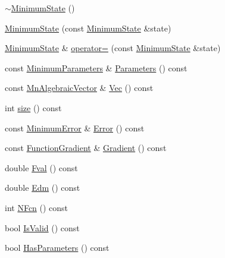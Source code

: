 \begin{DoxyCompactItemize}
\item 
\mbox{\hyperlink{classROOT_1_1Minuit2_1_1MinimumState_a30666c7113d7e8c199d4de1b1a44ee03}{$\sim$\+Minimum\+State}} ()
\item 
\mbox{\hyperlink{classROOT_1_1Minuit2_1_1MinimumState_a7e5a25f631c74fffd8cfd14d2268600e}{Minimum\+State}} (const \mbox{\hyperlink{classROOT_1_1Minuit2_1_1MinimumState}{Minimum\+State}} \&state)
\item 
\mbox{\hyperlink{classROOT_1_1Minuit2_1_1MinimumState}{Minimum\+State}} \& \mbox{\hyperlink{classROOT_1_1Minuit2_1_1MinimumState_ad0d12f94b8f1adca2b2c4279006f82e4}{operator=}} (const \mbox{\hyperlink{classROOT_1_1Minuit2_1_1MinimumState}{Minimum\+State}} \&state)
\item 
const \mbox{\hyperlink{classROOT_1_1Minuit2_1_1MinimumParameters}{Minimum\+Parameters}} \& \mbox{\hyperlink{classROOT_1_1Minuit2_1_1MinimumState_aa81bb59c8eb8c262ef2487ca1b025481}{Parameters}} () const
\item 
const \mbox{\hyperlink{namespaceROOT_1_1Minuit2_a62ed97730a1ca8d3fbaec64a19aa11c9}{Mn\+Algebraic\+Vector}} \& \mbox{\hyperlink{classROOT_1_1Minuit2_1_1MinimumState_a0c7ad9c9226473f87b1bbb15ed87bbcd}{Vec}} () const
\item 
int \mbox{\hyperlink{classROOT_1_1Minuit2_1_1MinimumState_af680928a4485a4d0db0c81a8283d24bd}{size}} () const
\item 
const \mbox{\hyperlink{classROOT_1_1Minuit2_1_1MinimumError}{Minimum\+Error}} \& \mbox{\hyperlink{classROOT_1_1Minuit2_1_1MinimumState_a28d9bb6148e54a7bf4ca15ca9548fe23}{Error}} () const
\item 
const \mbox{\hyperlink{classROOT_1_1Minuit2_1_1FunctionGradient}{Function\+Gradient}} \& \mbox{\hyperlink{classROOT_1_1Minuit2_1_1MinimumState_a08a0d667e1f89522a29c49c9c02e642d}{Gradient}} () const
\item 
double \mbox{\hyperlink{classROOT_1_1Minuit2_1_1MinimumState_aad936fc04cd24c5b769748b93ded0ab9}{Fval}} () const
\item 
double \mbox{\hyperlink{classROOT_1_1Minuit2_1_1MinimumState_a397315b170efca9446f7d6a91bae6c59}{Edm}} () const
\item 
int \mbox{\hyperlink{classROOT_1_1Minuit2_1_1MinimumState_aedc2a07bcaf49ef63ac092a867463731}{N\+Fcn}} () const
\item 
bool \mbox{\hyperlink{classROOT_1_1Minuit2_1_1MinimumState_ae8bab1ba76b2d6597c79224e966da5f5}{Is\+Valid}} () const
\item 
bool \mbox{\hyperlink{classROOT_1_1Minuit2_1_1MinimumState_a5871d5838abf68982d9e2ed7a66ea5c3}{Has\+Parameters}} () const

\end{DoxyCompactItemize}
